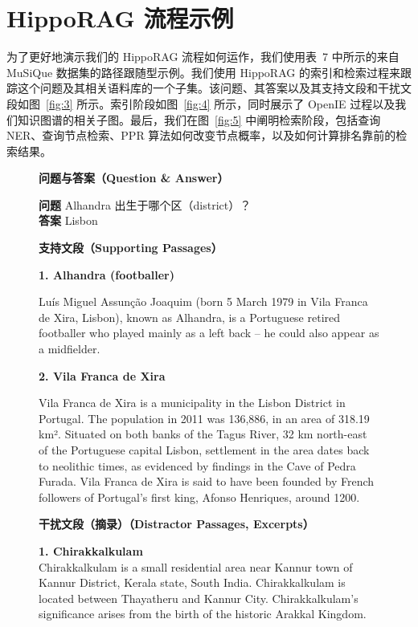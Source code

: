 \documentclass[11pt,UTF8,fontset=fandol]{ctexart}
\begin{document}
\section{HippoRAG 流程示例}

为了更好地演示我们的 HippoRAG 流程如何运作，我们使用表~7 中所示的来自 MuSiQue 数据集的路径跟随型示例。我们使用 HippoRAG 的索引和检索过程来跟踪这个问题及其相关语料库的一个子集。该问题、其答案以及其支持文段和干扰文段如图~\ref{fig:3} 所示。索引阶段如图~\ref{fig:4} 所示，同时展示了 OpenIE 过程以及我们知识图谱的相关子图。最后，我们在图~\ref{fig:5} 中阐明检索阶段，包括查询 NER、查询节点检索、PPR 算法如何改变节点概率，以及如何计算排名靠前的检索结果。

\begin{figure}[H]\centering
\begin{tcolorbox}[colback=white,colframe=black!55,boxrule=0.5pt,left=4pt,right=4pt,top=3pt,bottom=3pt,width=\linewidth]
\begin{center}\textbf{问题与答案（Question \& Answer）}\end{center}
\textbf{问题} \quad Alhandra 出生于哪个区（district）？\\
\textbf{答案} \quad Lisbon

\begin{center}\textbf{支持文段（Supporting Passages）}\end{center}
\textbf{1. Alhandra (footballer)}

Luís Miguel Assunção Joaquim (born 5 March 1979 in Vila Franca de Xira, Lisbon), known as Alhandra, is a Portuguese retired footballer who played mainly as a left back -- he could also appear as a midfielder.

\textbf{2. Vila Franca de Xira}

Vila Franca de Xira is a municipality in the Lisbon District in Portugal. The population in 2011 was 136,886, in an area of 318.19 km². Situated on both banks of the Tagus River, 32 km north-east of the Portuguese capital Lisbon, settlement in the area dates back to neolithic times, as evidenced by findings in the Cave of Pedra Furada. Vila Franca de Xira is said to have been founded by French followers of Portugal's first king, Afonso Henriques, around 1200.

\begin{center}\textbf{干扰文段（摘录）（Distractor Passages, Excerpts）}\end{center}
\textbf{1. Chirakkalkulam}\\
Chirakkalkulam is a small residential area near Kannur town of Kannur District, Kerala state, South India. Chirakkalkulam is located between Thayatheru and Kannur City. Chirakkalkulam's significance arises from the birth of the historic Arakkal Kingdom.


\end{tcolorbox}
\end{figure}
\end{document}
